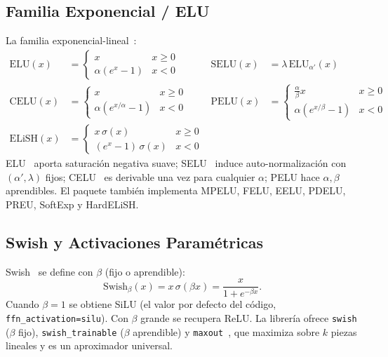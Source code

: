 \subsection{Familia Exponencial / ELU}

La familia exponencial-lineal~\citep{clevert2016elu,klambauer2017selu,dubey2021activations}:
\begin{align*}
\text{ELU}(x) &= \begin{cases} x & x\ge0 \\ \alpha(e^{x}-1) & x<0 \end{cases} &
\text{SELU}(x) &= \lambda\,\text{ELU}_{\alpha'}(x) \\
\text{CELU}(x) &= \begin{cases} x & x\ge0 \\ \alpha(e^{x/\alpha}-1) & x<0 \end{cases} &
\text{PELU}(x) &= \begin{cases} \tfrac{\alpha}{\beta}x & x\ge0 \\ \alpha(e^{x/\beta}-1) & x<0 \end{cases} \\
\text{ELiSH}(x) &= \begin{cases} x\,\sigma(x) & x\ge0 \\ (e^{x}-1)\,\sigma(x) & x<0 \end{cases}
\end{align*}
ELU~\citep{clevert2016elu} aporta saturación negativa suave; SELU~\citep{klambauer2017selu}
induce auto-normalización con $(\alpha',\lambda)$ fijos; CELU~\citep{barron2017celu} es
derivable una vez para cualquier $\alpha$; PELU hace $\alpha,\beta$ aprendibles. El paquete
también implementa MPELU, FELU, EELU, PDELU, PREU, SoftExp y HardELiSH.

\subsection{Swish y Activaciones Paramétricas}

Swish~\citep{ramachandran2017swish} se define con $\beta$ (fijo o aprendible):
\[
\text{Swish}_\beta(x) = x\,\sigma(\beta x) = \frac{x}{1+e^{-\beta x}}.
\]
Cuando $\beta=1$ se obtiene SiLU (el valor por defecto del código,
\texttt{ffn\_activation=silu}). Con $\beta$ grande se recupera ReLU. La
librería ofrece \texttt{swish} ($\beta$ fijo), \texttt{swish\_trainable}
($\beta$ aprendible) y \texttt{maxout}~\citep{goodfellow2013maxout}, que
maximiza sobre $k$ piezas lineales y es un aproximador universal.

